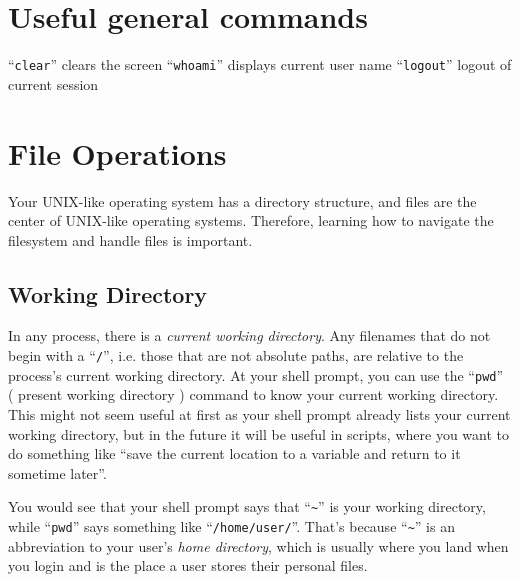 \documentclass{extbook}
\begin{document}

\section{Useful general commands}
``\verb|clear|'' clears the screen
``\verb|whoami|'' displays current user name
``\verb|logout|'' logout of current session

\section{File Operations}

Your UNIX-like operating system has a directory structure, and files are the center of UNIX-like operating systems.  Therefore, learning how to navigate the filesystem and handle files is important.

\subsection{Working Directory}

In any process, there is a \textit{current working directory}.  Any filenames that do not begin with a ``\verb|/|'', i.e. those that are not absolute paths, are relative to the process's current working directory.  At your shell prompt, you can use the ``\verb|pwd|'' ( present working directory ) command to know your current working directory.  This might not seem useful at first as your shell prompt already lists your current working directory, but in the future it will be useful in scripts, where you want to do something like ``save the current location to a variable and return to it sometime later''.

You would see that your shell prompt says that ``\verb|~|'' is your working directory, while ``\verb|pwd|'' says something like ``\verb|/home/user/|''.  That's because ``\verb|~|'' is an abbreviation to your user's \textit{home directory}, which is usually where you land when you login and is the place a user stores their personal files.
\end{document}
